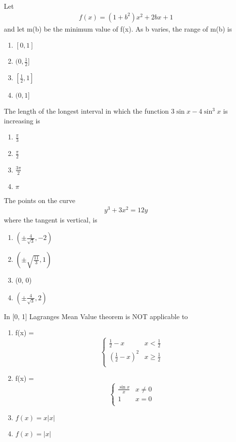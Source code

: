 \item Let 
\begin{align} 
f(x) = (1 + b^2)x^2 + 2bx + 1
\end{align} 
and let m(b) be the minimum value of f(x). As b varies, the range of m(b) is
\begin{enumerate}
\item $[0, 1]$
\item $(0, \frac{1}{2}]$
\item $[\frac{1}{2} ,1]$
\item $(0, 1]$
\end{enumerate}

\item The length of the longest interval in which the function $3\sin x - 4\sin^3x$ is increasing is
\begin{enumerate}
\item $\frac{\pi}{3}$
\item $\frac{\pi}{2}$
\item $\frac{3\pi}{2}$
\item ${\pi}$
\end{enumerate}

\item The points on the curve 
\begin{align} 
y^3 + 3x^2 = 12y
\end{align} 
where the tangent is vertical, is 
\begin{enumerate}
\item $(\pm\frac{4}{\sqrt{3}}, -2)$
\item $(\pm\sqrt{\frac{11}{3}}, 1)$
\item (0, 0)
\item $(\pm\frac{4}{\sqrt{3}}, 2)$
\end{enumerate}

\item In [0, 1] Lagranges Mean Value theorem is NOT applicable to
\begin{enumerate}
\item 
f(x) =
\[\begin{cases} 
      \frac{1}{2} - x &  x < \frac{1}{2} \\
      (\frac{1}{2} - x)^2 & x \geq \frac{1}{2} \\
   \end{cases}\] 
\item 
f(x) =
\[\begin{cases} 
      \frac{\sin x}{x} &  x \neq 0 \\
      1 & x = 0\\
   \end{cases}\] 
\item $f(x) = x|x|$
\item $f(x) = |x|$
\end{enumerate}

